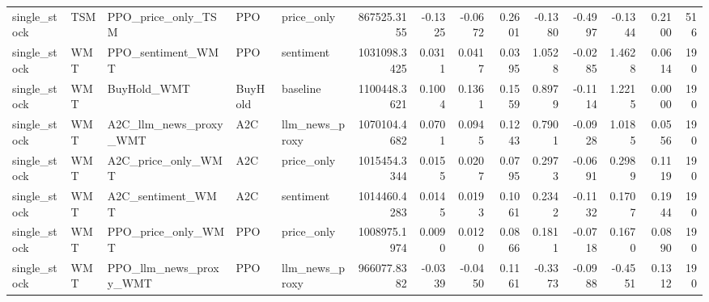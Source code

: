 \begin{tabular}{lllllrrrrrrrrr}
single_stock & TSM & PPO_price_only_TSM & PPO & price_only & 867525.3155 & -0.1325 & -0.0672 & 0.2601 & -0.1380 & -0.4997 & -0.1344 & 0.2100 & 516 \\
single_stock & WMT & PPO_sentiment_WMT & PPO & sentiment & 1031098.3425 & 0.0311 & 0.0417 & 0.0395 & 1.0528 & -0.0285 & 1.4628 & 0.0614 & 190 \\
single_stock & WMT & BuyHold_WMT & BuyHold & baseline & 1100448.3621 & 0.1004 & 0.1361 & 0.1559 & 0.8979 & -0.1114 & 1.2215 & 0.0000 & 190 \\
single_stock & WMT & A2C_llm_news_proxy_WMT & A2C & llm_news_proxy & 1070104.4682 & 0.0701 & 0.0945 & 0.1243 & 0.7901 & -0.0928 & 1.0185 & 0.0556 & 190 \\
single_stock & WMT & A2C_price_only_WMT & A2C & price_only & 1015454.3344 & 0.0155 & 0.0207 & 0.0795 & 0.2973 & -0.0691 & 0.2989 & 0.1119 & 190 \\
single_stock & WMT & A2C_sentiment_WMT & A2C & sentiment & 1014460.4283 & 0.0145 & 0.0193 & 0.1061 & 0.2342 & -0.1132 & 0.1707 & 0.1944 & 190 \\
single_stock & WMT & PPO_price_only_WMT & PPO & price_only & 1008975.1974 & 0.0090 & 0.0120 & 0.0866 & 0.1811 & -0.0718 & 0.1670 & 0.0890 & 190 \\
single_stock & WMT & PPO_llm_news_proxy_WMT & PPO & llm_news_proxy & 966077.8382 & -0.0339 & -0.0450 & 0.1161 & -0.3373 & -0.0988 & -0.4551 & 0.1312 & 190 \\
\bottomrule
\end{tabular}
